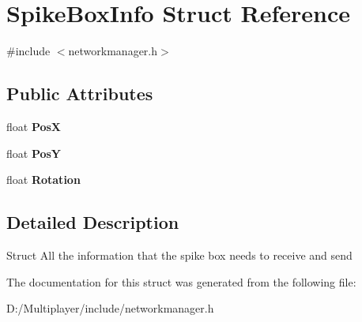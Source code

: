 \hypertarget{struct_spike_box_info}{}\section{Spike\+Box\+Info Struct Reference}
\label{struct_spike_box_info}


{\ttfamily \#include $<$networkmanager.\+h$>$}

\subsection*{Public Attributes}
\begin{DoxyCompactItemize}
\item 
\mbox{\label{struct_spike_box_info_a27fffbfeaf328251eca084c589dc49b9}} 
float {\bfseries PosX}
\item 
\mbox{\label{struct_spike_box_info_ae2ac8d64043b7da65ec441b5770919be}} 
float {\bfseries PosY}
\item 
\mbox{\label{struct_spike_box_info_ae9ac2a746c9d5f5b080aad93ac93738a}} 
float {\bfseries Rotation}
\end{DoxyCompactItemize}


\subsection{Detailed Description}
Struct All the information that the spike box needs to receive and send 

The documentation for this struct was generated from the following file\+:\begin{DoxyCompactItemize}
\item 
D\+:/\+Multiplayer/include/networkmanager.\+h\end{DoxyCompactItemize}
